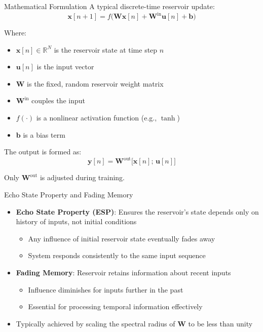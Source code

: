 \documentclass{beamer}
\begin{document}
\begin{frame}{Mathematical Formulation}
A typical discrete-time reservoir update:
\[
\mathbf{x}[n+1] = f\bigl(\mathbf{W}\mathbf{x}[n] + \mathbf{W}^{\mathrm{in}}\mathbf{u}[n] + \mathbf{b}\bigr)
\]

Where:
\begin{itemize}
\item $\mathbf{x}[n]\in \mathbb{R}^N$ is the reservoir state at time step $n$
\item $\mathbf{u}[n]$ is the input vector
\item $\mathbf{W}$ is the fixed, random reservoir weight matrix
\item $\mathbf{W}^{\mathrm{in}}$ couples the input
\item $f(\cdot)$ is a nonlinear activation function (e.g., $\tanh$)
\item $\mathbf{b}$ is a bias term
\end{itemize}

The output is formed as:
\[
\mathbf{y}[n] = \mathbf{W}^{\mathrm{out}}\bigl[\mathbf{x}[n];\,\mathbf{u}[n]\bigr]
\]

Only $\mathbf{W}^{\mathrm{out}}$ is adjusted during training.
\end{frame}

\begin{frame}{Echo State Property and Fading Memory}
\begin{itemize}
\item \textbf{Echo State Property (ESP)}: Ensures the reservoir's state depends only on history of inputs, not initial conditions
    \begin{itemize}
    \item Any influence of initial reservoir state eventually fades away
    \item System responds consistently to the same input sequence
    \end{itemize}
\item \textbf{Fading Memory}: Reservoir retains information about recent inputs
    \begin{itemize}
    \item Influence diminishes for inputs further in the past
    \item Essential for processing temporal information effectively
    \end{itemize}
\item Typically achieved by scaling the spectral radius of $\mathbf{W}$ to be less than unity
\end{itemize}
\end{frame}
\end{document}
